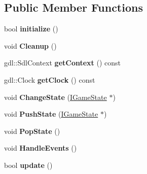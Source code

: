 \subsection*{Public Member Functions}
\begin{DoxyCompactItemize}
\item 
\hypertarget{class_game_engine_aea52c2df16819a71ab9fe8118e0abdde}{}bool {\bfseries initialize} ()\label{class_game_engine_aea52c2df16819a71ab9fe8118e0abdde}

\item 
\hypertarget{class_game_engine_a259f741736a0d4429586cb268272d27a}{}void {\bfseries Cleanup} ()\label{class_game_engine_a259f741736a0d4429586cb268272d27a}

\item 
\hypertarget{class_game_engine_a4b85e8905d35f4b890c9ebd66b8cc51d}{}gdl\+::\+Sdl\+Context {\bfseries get\+Context} () const \label{class_game_engine_a4b85e8905d35f4b890c9ebd66b8cc51d}

\item 
\hypertarget{class_game_engine_ae6e381b14404418ddf8b3ddecc3cfd90}{}gdl\+::\+Clock {\bfseries get\+Clock} () const \label{class_game_engine_ae6e381b14404418ddf8b3ddecc3cfd90}

\item 
\hypertarget{class_game_engine_a2675e74989b5c08452eff45b7ac7e82a}{}void {\bfseries Change\+State} (\hyperlink{class_i_game_state}{I\+Game\+State} $\ast$)\label{class_game_engine_a2675e74989b5c08452eff45b7ac7e82a}

\item 
\hypertarget{class_game_engine_a460e6cab4805944c7e4b177361c574ae}{}void {\bfseries Push\+State} (\hyperlink{class_i_game_state}{I\+Game\+State} $\ast$)\label{class_game_engine_a460e6cab4805944c7e4b177361c574ae}

\item 
\hypertarget{class_game_engine_af97451dad66fdf759855e06f2fb1afbb}{}void {\bfseries Pop\+State} ()\label{class_game_engine_af97451dad66fdf759855e06f2fb1afbb}

\item 
\hypertarget{class_game_engine_ad891e2f56d13c73744ddb51a77c67b4d}{}void {\bfseries Handle\+Events} ()\label{class_game_engine_ad891e2f56d13c73744ddb51a77c67b4d}

\item 
\hypertarget{class_game_engine_a2f0e84b7f70f82b9c6a8cf1b6c7715bf}{}bool {\bfseries update} ()\label{class_game_engine_a2f0e84b7f70f82b9c6a8cf1b6c7715bf}


\end{DoxyCompactItemize}
